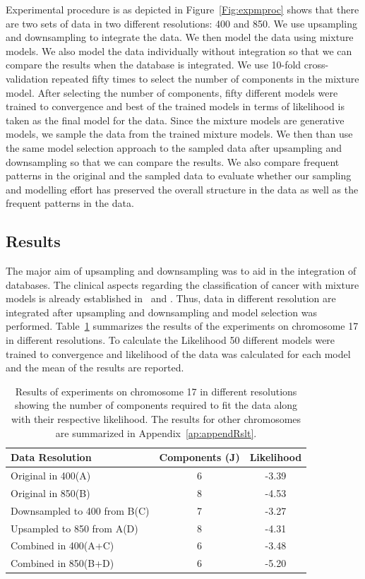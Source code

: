 Experimental procedure is as depicted in Figure~\ref{Fig:expmproc} shows that there are two sets of data in two different resolutions: 400 and 850. We use upsampling and downsampling to integrate the data. We then model the data using mixture models. We also model the data individually without integration so that we can compare the results when the database is integrated. We use 10-fold cross-validation repeated fifty times to select the number of components in the mixture model. After selecting the number of components, fifty different models were trained to convergence and best of the trained models in terms of likelihood is taken as the final model for the data. Since the mixture models are generative models, we sample the data from the trained mixture models. We then than use the same model selection approach to the sampled data after upsampling and downsampling so that we can compare the results. We also compare frequent patterns in the original and the sampled data to evaluate whether our sampling and modelling effort has preserved the overall structure in the data as well as the frequent patterns in the data. 
 
\subsection{Results}
The major aim of upsampling and downsampling was to aid in the integration of databases. The clinical aspects regarding the classification of cancer with mixture models is already established in~\cite{Myllykangas200815} and \cite{Myllykangas20067324}. Thus, data in different resolution are integrated after upsampling and downsampling and model selection was performed. Table~\ref{Tab:results} summarizes the results of the experiments on chromosome 17 in different resolutions. To calculate the Likelihood 50 different models were trained to convergence and likelihood of the data was calculated for each model and the mean of the results are reported.

\begin{table}[h!]
  \centering
  \begin{tabular}{|l|c|c|}
    \hline
    \textbf{Data Resolution} & \textbf{Components (J)} &\textbf{Likelihood}  \\
    \hline
    Original in 400(A)		&	6	& 	-3.39  \\ \hline
    Original in 850(B)		&	8	& 	-4.53  \\ \hline
    Downsampled to 400 from B(C)&	7	& 	-3.27  \\ \hline
    Upsampled to 850 from A(D)	&	8	& 	-4.31  \\ \hline
    Combined  in 400(A+C)	&	6	& 	-3.48  \\ \hline
    Combined in 850(B+D)	&	6	& 	-5.20  \\ \hline     
  \end{tabular}
  \caption[Results on Chromosome 17 in original data]{Results of experiments on chromosome 17 in different resolutions showing the number of components required to fit the data along with their respective likelihood. The results for other chromosomes are summarized in Appendix~\ref{ap:appendRslt}.}\label{Tab:results}
\end{table}

